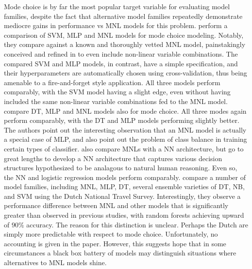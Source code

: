 \documentclass[conference]{IEEEtran}
\begin{document}
Mode choice is by far the most popular target variable for evaluating model families, despite the fact that alternative model families repeatedly demonstrate mediocre gains in performance vs MNL models for this problem.
 \cite{zhang2008travel} perform a comparison of SVM, MLP and MNL models for mode choice modeling.
 Notably, they compare against a known and thoroughly vetted MNL model, painstakingly conceived and refined in \cite{koppelman2006self} to even include non-linear variable combinations.
 The compared SVM and MLP models, in contrast, have a simple specification, and their hyperparameters are automatically chosen using cross-validation, thus being amenable to a fire-and-forget style application.
 All three models perform comparably, with the SVM model having a slight edge, even without having included the same non-linear variable combinations fed to the MNL model.
 \cite{xie2003work} compare DT, MLP and MNL models also for mode choice.
 All three modes again perform comparably, with the DT and MLP models performing slightly better.
 The authors point out the interesting observation that an MNL model is actually a special case of MLP, and also point out the problem of class balance in training certain types of classifier.
 \cite{vythoulkas2003modeling} also compare MNLs with a NN architecture, but go to great lengths to develop a NN architecture that captures various decision structures hypothesized to be analagous to natural human reasoning.
 Even so, the NN and logistic regression models perform comparably.
 \cite{hagenauer2017comparative} compare a number of model families, including MNL, MLP, DT, several ensemble varieties of DT, NB, and SVM using the Dutch National Travel Survey.
 Interestingly, they observe a performance difference between MNL and other models that is significantly greater than observed in previous studies, with random forests achieving upward of $90\%$ accuracy.
 The reason for this distinction is unclear.
 Perhaps the Dutch are simply more predictable with respect to mode choice.
 Unfortunately, no accounting is given in the paper.
 However, this suggests hope that in some circumstances a black box battery of models may distinguish situations where alternatives to MNL models shine.
\end{document}
